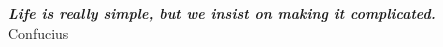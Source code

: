 \thispagestyle{empty}
\hbox{} \vfill
\begin{flushright}
  \small \textit{\textbf{Life is really simple, but we insist on making it complicated.}}
  \\ \vspace{2mm}
  \scriptsize Confucius
\end{flushright}

\clearpage
\thispagestyle{empty}
\cleardoublepage
